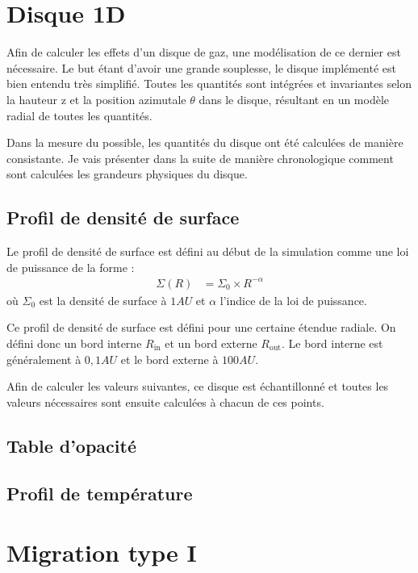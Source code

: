 \documentclass[logos,parttoc]{bordeaux-thesis}
\begin{document}

\section{Disque 1D}
Afin de calculer les effets d'un disque de gaz, une modélisation de ce dernier est nécessaire. Le but étant d'avoir une grande souplesse, le disque implémenté est bien entendu très simplifié. Toutes les quantités sont intégrées et invariantes selon la hauteur z et la position azimutale $\theta$ dans le disque, résultant en un modèle radial de toutes les quantités. 

Dans la mesure du possible, les quantités du disque ont été calculées de manière consistante. Je vais présenter dans la suite de manière chronologique comment sont calculées les grandeurs physiques du disque.
\subsection{Profil de densité de surface}
Le profil de densité de surface est défini au début de la simulation comme une loi de puissance de la forme :
\begin{align}
\Sigma(R) &= \Sigma_0 \times R^{-\alpha}
\end{align}
où $\Sigma_0$ est la densité de surface à $1\unit{AU}$ et $\alpha$ l'indice de la loi de puissance. 

Ce profil de densité de surface est défini pour une certaine étendue radiale. On défini donc un bord interne $R_\text{in}$ et un bord externe $R_\text{out}$. Le bord interne est généralement à $0,1\unit{AU}$ et le bord externe à $100\unit{AU}$. 

Afin de calculer les valeurs suivantes, ce disque est échantillonné et toutes les valeurs nécessaires sont ensuite calculées à chacun de ces points. 

\subsection{Table d'opacité}
\subsection{Profil de température}
\section{Migration type I}
\end{document}
